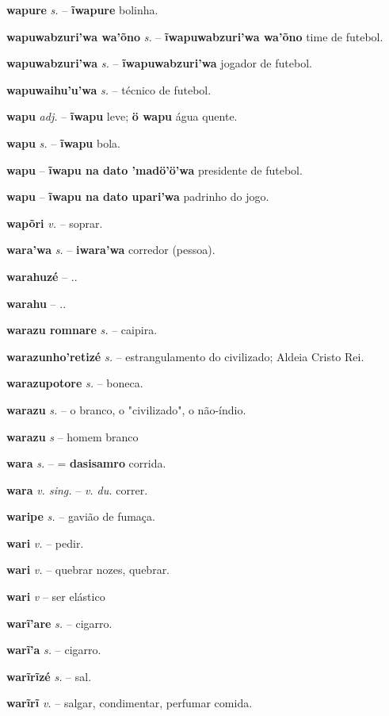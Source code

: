 \textbf{wapure} \textit{s.} -- \textbf{ĩwapure} bolinha.

\textbf{wapuwabzuri'wa wa'õno} \textit{s.} -- \textbf{ĩwapuwabzuri'wa wa'õno} time de futebol.

\textbf{wapuwabzuri'wa} \textit{s.} -- \textbf{ĩwapuwabzuri'wa} jogador de futebol.

\textbf{wapuwaihu'u'wa} \textit{s.} -- técnico de futebol.

\textbf{wapu} \textit{adj.} -- \textbf{ĩwapu} leve; \textbf{ö wapu} água quente.

\textbf{wapu} \textit{s.} -- \textbf{ĩwapu} bola.

\textbf{wapu} \textit{} -- \textbf{ĩwapu na dato 'madö'ö'wa} presidente de futebol.

\textbf{wapu} \textit{} -- \textbf{ĩwapu na dato upari'wa} padrinho do jogo.

\textbf{wapõri} \textit{v.} -- soprar.

\textbf{wara'wa} \textit{s.} -- \textbf{iwara'wa} corredor (pessoa).

\textbf{warahuzé} \textit{} -- ..

\textbf{warahu} \textit{} -- ..

\textbf{warazu romnare} \textit{s.} -- caipira.

\textbf{warazunho'retizé} \textit{s.} -- estrangulamento do civilizado; Aldeia Cristo Rei.

\textbf{warazupotore} \textit{s.} -- boneca.

\textbf{warazu} \textit{s.} -- o branco, o "civilizado", o não-índio.

\textbf{warazu} \textit{s} -- {homem branco}

\textbf{wara} \textit{s.} -- = \textbf{dasisamro} corrida.

\textbf{wara} \textit{v. sing.} -- \textit{v. du.} correr.

\textbf{waripe} \textit{s.} -- gavião de fumaça.

\textbf{wari} \textit{v.} -- pedir.

\textbf{wari} \textit{v.} -- quebrar nozes, quebrar.

\textbf{wari} \textit{v} -- {ser elástico}

\textbf{warĩ'are} \textit{s.} -- cigarro.

\textbf{warĩ'a} \textit{s.} -- cigarro.

\textbf{warĩrĩzé} \textit{s.} -- sal.

\textbf{warĩrĩ} \textit{v.} -- salgar, condimentar, perfumar comida.


